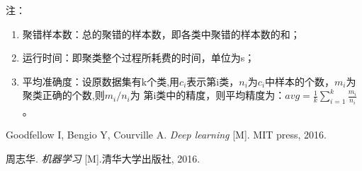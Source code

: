 注：
\begin{enumerate}\itemsep0em
		\item 聚错样本数：总的聚错的样本数，即各类中聚错的样本数的和；
		\item 运行时间：即聚类整个过程所耗费的时间，单位为s；
		\item 平均准确度：设原数据集有k个类,用$c_i$表示第i类，$n_i$为$c_i$中样本的个数，$m_i$为聚类正确的个数,则$m_i/n_i$为 第i类中的精度，则平均精度为：$avg=\frac{1}{k}\sum_{i=1}^{k}\frac{m_{i}}{n_{i}}$。
\end{enumerate}

\begin{thebibliography}{9}

Goodfellow I, Bengio Y, Courville A.
{\it Deep learning}
[M]. MIT press, 2016.

周志华.
{\it 机器学习}
[M].清华大学出版社, 2016.

%
\end{thebibliography}



%
%
%
%
%
